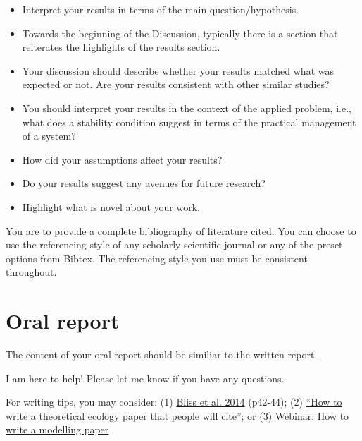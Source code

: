 \documentclass[]{book}
\providecommand{\tightlist}{%
  \setlength{\itemsep}{0pt}\setlength{\parskip}{0pt}}
\begin{document}
\begin{itemize}
\tightlist
\item
  Interpret your results in terms of the main question/hypothesis.
\item
  Towards the beginning of the Discussion, typically there is a section
  that reiterates the highlights of the results section.
\item
  Your discussion should describe whether your results matched what was
  expected or not. Are your results consistent with other similar
  studies?
\item
  You should interpret your results in the context of the applied
  problem, i.e., what does a stability condition suggest in terms of the
  practical management of a system?
\item
  How did your assumptions affect your results?
\item
  Do your results suggest any avenues for future research?
\item
  Highlight what is novel about your work.
\end{itemize}

You are to provide a complete bibliography of literature cited. You can
choose to use the referencing style of any scholarly scientific journal
or any of the preset options from Bibtex. The referencing style you use
must be consistent throughout.

\section{Oral report}\label{oral-report}

The content of your oral report should be similiar to the written
report.

I am here to help! Please let me know if you have any questions.

For writing tips, you may consider: (1)
\href{https://m3challenge.siam.org/sites/default/files/uploads/siam-guidebook-final-press.pdf}{Bliss
et al. 2014} (p42-44); (2)
\href{http://matryoshka.org/2012/07/13/how-to-write-a-paper-people-will-cite/}{``How
to write a theoretical ecology paper that people will cite''}; or (3)
\href{https://video.mbi.ohio-state.edu/video/player/?id=4775\&title=Webinar\%3A\%20How\%20to\%20Write\%20a\%20Modelling\%20Paper}{Webinar:
How to write a modelling paper}
\end{document}
